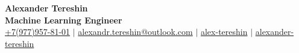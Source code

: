 \documentclass[letterpaper,11pt]{article}
\begin{document}
\begin{center}
    \textbf{\Huge Alexander Tereshin} \\ \vspace{5pt}
    \textbf{\Large Machine Learning Engineer} \\ \vspace{5pt}
    \small
    \faMobile \hspace{.5pt} \href{tel:+7(977)957-81-01}{+7(977)957-81-01}
    $|$
    \faAt \hspace{.5pt} \href{mailto:alexandr.tereshin@outlook.com}{alexandr.tereshin@outlook.com}
    $|$
    \faLinkedinSquare \hspace{.5pt} \href{https://www.linkedin.com/in/alex-tereshin}{alex-tereshin}
    $|$
    \faGithub \hspace{.5pt} \href{https://github.com/alexander-tereshin}{alexander-tereshin}
\end{center}
\vspace{-15pt}



\end{document}
